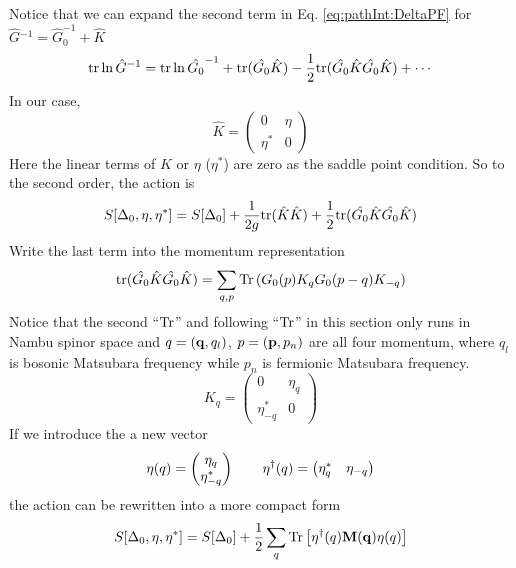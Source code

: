Notice that we can expand the second term in Eq. \ref{eq:pathInt:DeltaPF} for $\hat{G}{}^{-1}=\hat{G}_{0}^{-1}+\hat{K}$
\begin{equation}
\text{tr}\ln \hat{G}^{-1}=\text{tr}\ln\hat{G_{0}}^{-1}+\text{tr}(\hat{G_{0}}\hat{K})-\frac{1}{2}\text{tr}(\hat{G_{0}}\hat{K}\hat{G_{0}}\hat{K})+\cdots
\end{equation}
In our case,
\begin{equation}
\hat{K}=\begin{pmatrix}
0&\eta\\
\eta^{*}&0
\end{pmatrix}
\end{equation}
Here the linear terms of $\hat{K}$ or $\eta$ ($\eta^{*}$) are zero as the saddle point condition.  So to the second order, the action is 
\begin{equation}\label{eq:pathInt:DeltaActionGaussian}
S[\Delta_{0},\eta,\eta^{*}]=S[\Delta_{0}]+
	\frac{1}{2g}\text{tr}(\hat{K}\hat{K})+\frac{1}{2}\text{tr}(\hat{G_{0}}\hat{K}\hat{G_{0}}\hat{K})
\end{equation}
Write the last term into the momentum representation
\begin{equation}
\text{tr}(\hat{G_{0}}\hat{K}\hat{G_{0}}\hat{K})=\sum_{q,p}\text{Tr}\left(G_{0}({p})K_{q}G_{0}{}({p-q})K_{-q}\right)
\end{equation}
Notice that the second ``$\text{Tr}$'' and following ``$\text{Tr}$'' in this section only runs in Nambu spinor space and $q={(\mathbf{q},q_{l})}$, $p=(\mathbf{p},p_{n})$ are all four momentum, where $q_{l}$ is bosonic Matsubara frequency while $p_{n}$ is fermionic Matsubara frequency.
\begin{equation}
K_{q}=\begin{pmatrix}
0&\eta_{q}\\
\eta^{*}_{-q}&0
\end{pmatrix}
\end{equation}
If we introduce the a new vector 
\begin{equation}
\eta{(q)}=\begin{pmatrix}\eta_{q}\\\eta^{*}_{-q}\end{pmatrix}\qquad
\eta^{\dagger}{(q)}=\begin{pmatrix}\eta^{*}_{q}&\eta_{-q}\end{pmatrix}
\end{equation}
the action can be rewritten into a more compact form
\begin{equation}
S[\Delta_{0},\eta,\eta^{*}]=S[\Delta_{0}]+\frac{1}{2}\sum_{q}\text{Tr}\left[\eta^{\dagger}(q)\mathbf{M(q)}\eta(q)\right]
\end{equation}
